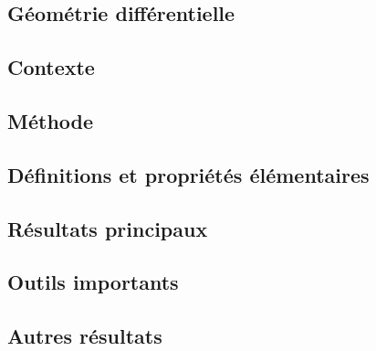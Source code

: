 \documentclass[11pt,a4paper]{article}
\begin{document}
\newpage
\begin{center}  
\section*{Géométrie différentielle} 
\end{center}



\subsection*{Contexte}

\subsection*{Méthode}

\subsection*{Définitions et propriétés élémentaires}

\subsection*{Résultats principaux}

\subsection*{Outils importants}


\subsection*{Autres résultats}
\end{document}
